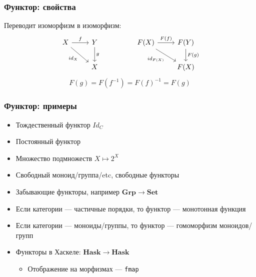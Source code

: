 \documentclass{beamer}
\begin{document}
\begin{frame}[fragile]
\frametitle{Функтор: свойства}
Переводит изоморфизм в изоморфизм:
\begin{equation}
\begin{tikzcd}
X \arrow{r}{f} \arrow{rd}[swap]{id_X} & Y \arrow{d}{g} && F(X) \arrow{r}{F(f)} \arrow{rd}[swap]{id_{F(X)}} & F(Y) \arrow{d}{F(g)} \\
& X &&& F(X)
\end{tikzcd}
\end{equation}
\pause
\begin{equation}
F(g) = F(f^{-1}) = F(f)^{-1} = F(g)
\end{equation}
\end{frame}

\begin{frame}
\frametitle{Функтор: примеры}
\begin{itemize}
\pause
\item Тождественный функтор \begin{math}Id_C\end{math}
\pause
\item Постоянный функтор
\pause
\item Множество подмножеств \begin{math}X \mapsto 2^X\end{math}
\pause
\item Свободный моноид/группа/etc, свободные функторы
\pause
\item Забывающие функторы, например \begin{math}\mathbf{Grp} \rightarrow \mathbf{Set}\end{math}
\pause
\item Если категории --- частичные порядки, то функтор --- монотонная функция
\pause
\item Если категории --- моноиды/группы, то функтор --- гомоморфизм моноидов/групп
\pause
\item Функторы в Хаскеле: \begin{math}\mathbf{Hask} \rightarrow \mathbf{Hask}\end{math}
\begin{itemize}
\item Отображение на морфизмах --- \texttt{fmap}
\end{itemize}
\end{itemize}
\end{frame}
\end{document}
